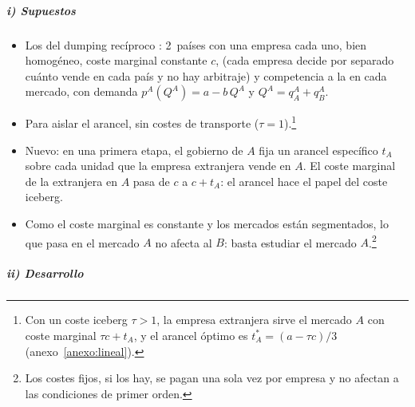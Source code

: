\documentclass[11pt]{article}
\begin{document}
\subparagraph{i) Supuestos}

\begin{itemize}
\item Los del dumping recíproco : 2~países con una empresa cada uno, bien homogéneo, coste marginal constante $c$,  (cada empresa decide por separado cuánto vende en cada país y no hay arbitraje) y competencia a la  en cada mercado, con demanda $p^A(Q^A)=a-b\,Q^A$ y $Q^A=q_A^A+q_B^A$.
\item Para aislar el arancel, sin costes de transporte ($\tau=1$).\footnote{Con un coste iceberg $\tau>1$, la empresa extranjera sirve el mercado $A$ con coste marginal $\tau c+t_A$, y el arancel óptimo es $t_A^*=(a-\tau c)/3$ (anexo~\ref{anexo:lineal}).}
\item Nuevo: en una primera etapa, el gobierno de $A$ fija un arancel específico $t_A$ sobre cada unidad que la empresa extranjera vende en $A$. El coste marginal de la extranjera en $A$ pasa de $c$ a $c+t_A$: el arancel hace el papel del coste iceberg.
\item Como el coste marginal es constante y los mercados están segmentados, lo que pasa en el mercado $A$ no afecta al $B$: basta estudiar el mercado $A$.\footnote{Los costes fijos, si los hay, se pagan una sola vez por empresa y no afectan a las condiciones de primer orden.}
\end{itemize}

\subparagraph{ii) Desarrollo}
\end{document}
